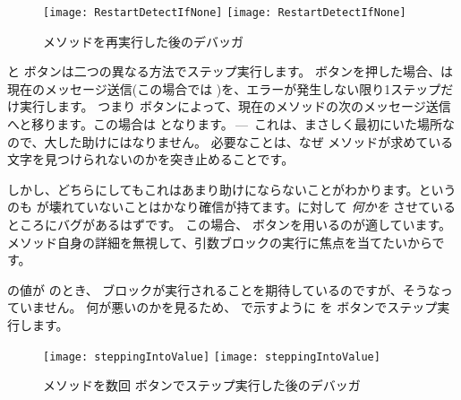 \documentclass[a4paper,10pt,twoside]{book}
\begin{document}
\begin{figure}[btp]
\begin{center}
\ifluluelse
{\texttt{[image: RestartDetectIfNone]}}
{\texttt{[image: RestartDetectIfNone]}}
\end{center}
\caption{ メソッドを再実行した後のデバッガ}
\end{figure}

 と  ボタンは二つの異なる方法でステップ実行します。 ボタンを押した場合、\pharo は現在のメッセージ送信(この場合では )を、エラーが発生しない限り1ステップだけ実行します。
つまり  ボタンによって、現在のメソッドの次のメッセージ送信へと移ります。この場合は  となります。\,---\, これは、まさしく最初にいた場所なので、大した助けにはなりません。
必要なことは、なぜ  メソッドが求めている文字を見つけられないのかを突き止めることです。



しかし、どちらにしてもこれはあまり助けにならないことがわかります。というのも  が壊れていないことはかなり確信が持てます。\pharo に対して \emph{何かを} させているところにバグがあるはずです。
この場合、 ボタンを用いるのが適しています。 メソッド自身の詳細を無視して、引数ブロックの実行に焦点を当てたいからです。


 の値が  のとき、 ブロックが実行されることを期待しているのですが、そうなっていません。
何が悪いのかを見るため、 で示すように  を  ボタンでステップ実行します。

\begin{figure}[btp]
\begin{center}
\ifluluelse
{\texttt{[image: steppingIntoValue]}}
{\texttt{[image: steppingIntoValue]}}
\end{center}
\caption{ メソッドを数回  ボタンでステップ実行した後のデバッガ}
\end{figure}
\end{document}
